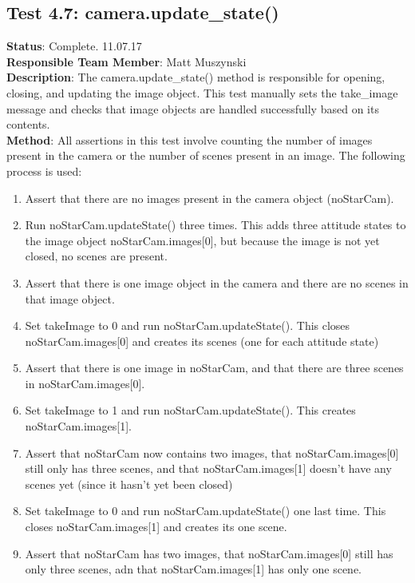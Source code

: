 \documentclass[]{DINOReportMemo}
\begin{document}
\subsection{Test 4.7: camera.update\_state()}
\textbf{Status}: Complete. 11.07.17\\
\textbf{Responsible Team Member}: Matt Muszynski \\
\textbf{Description}: The camera.update\_state() method is responsible for opening, closing, and updating the image object. This test manually sets the take\_image message and checks that image objects are handled successfully based on its contents. \\
\textbf{Method}: All assertions in this test involve counting the number of images present in the camera or the number of scenes present in an image. The following process is used:
\begin{enumerate}
    \item Assert that there are no images present in the camera object (noStarCam).
    \item Run noStarCam.updateState() three times. This adds three attitude states to the image object noStarCam.images[0], but because the image is not yet closed, no scenes are present.
    \item Assert that there is one image object in the camera and there are no scenes in that image object.
    \item Set takeImage to 0 and run noStarCam.updateState(). This closes noStarCam.images[0] and creates its scenes (one for each attitude state)
    \item Assert that there is one image in noStarCam, and that there are three scenes in noStarCam.images[0].
    \item Set takeImage to 1 and run noStarCam.updateState(). This creates noStarCam.images[1].
    \item Assert that noStarCam now contains two images, that noStarCam.images[0] still only has three scenes, and that noStarCam.images[1] doesn't have any scenes yet (since it hasn't yet been closed)
    \item Set takeImage to 0 and run noStarCam.updateState() one last time. This closes noStarCam.images[1] and creates its one scene.
    \item Assert that noStarCam has two images, that noStarCam.images[0] still has only three scenes, adn that noStarCam.images[1] has only one scene.
    
\end{enumerate}
\end{document}
